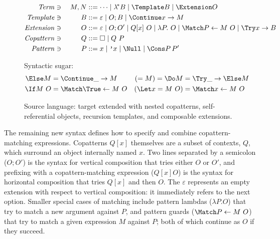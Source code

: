 \begin{figure}[t]
\centering
\small
\begin{alignat*}{2}
  \mathit{Term} &\ni{}& M, N
  &::= \dots
  \mid \lamstar B
  \mid \Template B
  \mid \Extension O
  \\
  \mathit{Template} &\ni{}& B
  &::= \varepsilon
  \mid O; B
  \mid \Continue x \to M
  \\
  \mathit{Extension} &\ni{}& O
  &::= \varepsilon
  \mid O; O'
  \mid Q[x] ~ O
  \mid \lambda P.~ O
  \mid \Match P \gets M ~ O
  \mid \Try x \to B
  \\
  \mathit{Copattern} &\ni{}& Q
  &::= \hole
  \mid Q ~ P
  \\
  \mathit{Pattern} &\ni{}& P
  &::= x
  \mid \q{x}
  \mid \Null
  \mid \Cons P \, P'
\end{alignat*}

Syntactic sugar:
\begin{align*}
  \Else M
  &=
  \Continue \_ \to M
  &
  (= M)
  =
  \Do M
  &=
  \Try \_ \to \Else M
  \\
  \If M ~ O
  &=
  \Match \True \gets M ~ O
  &
  (\Let x = M ~ O)
  &=
  \Match x \gets M ~ O
\end{align*}
\caption{Source language: target extended with nested copatterns,
  self-referential objects, recursion templates, and composable extensions.}
\label{fig:source-syntax}
\end{figure}

The remaining new syntax defines how to specify and combine copattern-matching expressions.
Copatterns $Q[x]$ themselves are a subset of contexts, $Q$, which surround an object internally named $x$.
Two lines separated by a semicolon ($O; O'$) is the syntax for vertical composition that tries either $O$ or $O'$, and prefixing with a copattern-matching expression ($Q[x] O$) is the syntax for horizontal composition that tries $Q[x]$ and then $O$.
The $\varepsilon$ represents an empty extension with respect to vertical composition: it immediately refers to the next option.
Smaller special cases of matching include pattern lambdas ($\lambda P. O$) that try to match a new argument against $P$, and pattern guards ($\Match P \gets M ~ O$) that try to match a given expression $M$ against $P$; both of which continue as $O$ if they succeed.


